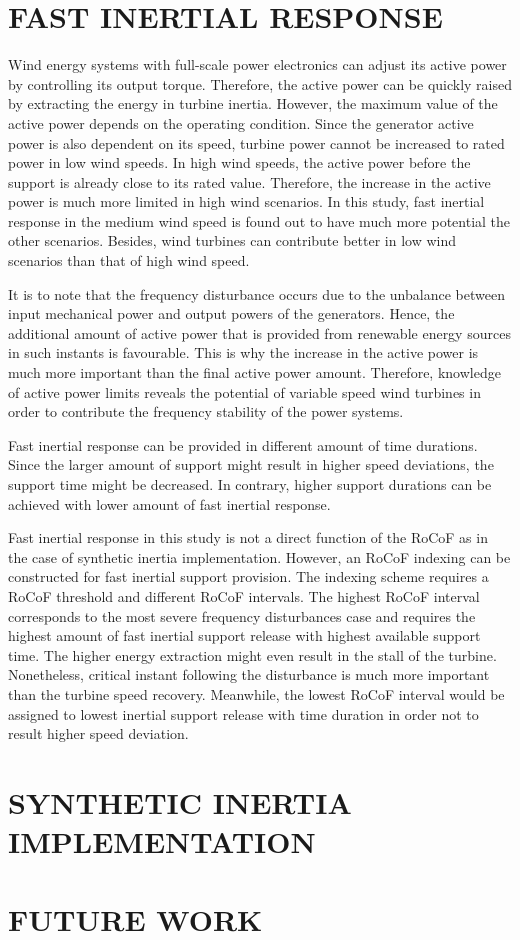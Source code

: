 \section{FAST INERTIAL RESPONSE}
Wind energy systems with full-scale power electronics can adjust its active power by controlling its output torque. Therefore, the active power can be quickly raised by extracting the energy in turbine inertia. However, the maximum value of the active power depends on the operating condition. Since the generator active power is also dependent on its speed, turbine power cannot be increased to rated power in low wind speeds. In high wind speeds, the active power before the support is already close to its rated value. Therefore, the increase in the active power is much more limited in high wind scenarios. In this study, fast inertial response in the medium wind speed is found out to have much more potential the other scenarios. Besides, wind turbines can contribute better in low wind scenarios than that of high wind speed.\par
It is to note that the frequency disturbance occurs due to the unbalance between input mechanical power and output powers of the generators. Hence, the additional amount of active power that is provided from renewable energy sources in such instants is favourable. This is why the increase in the active power is much more important than the final active power amount. Therefore, knowledge of active power limits reveals the potential of variable speed wind turbines in order to contribute the frequency stability of the power systems.\par
Fast inertial response can be provided in different amount of time durations. Since the larger amount of support might result in higher speed deviations, the support time might be decreased. In contrary, higher support durations can be achieved with lower amount of fast inertial response.\par
Fast inertial response in this study is not a direct function of the RoCoF as in the case of synthetic inertia implementation. However, an RoCoF indexing can be constructed for fast inertial support provision. The indexing scheme requires a RoCoF threshold and different RoCoF intervals. The highest RoCoF interval corresponds to the most severe frequency disturbances case and requires the highest amount of fast inertial support release with highest available support time. The higher energy extraction might even result in the stall of the turbine. Nonetheless, critical instant following the disturbance is much more important than the turbine speed recovery. Meanwhile, the lowest RoCoF interval would be assigned to lowest inertial support release with time duration in order not to result higher speed deviation. 
\section{SYNTHETIC INERTIA IMPLEMENTATION}

\section{FUTURE WORK}